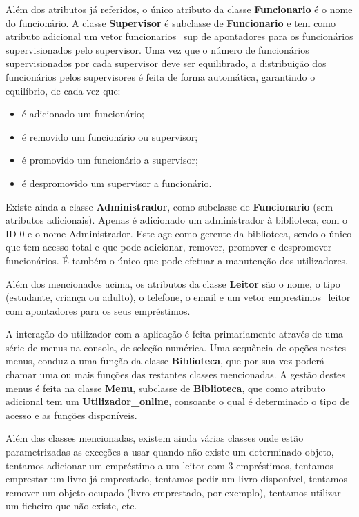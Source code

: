 \documentclass[12pt,a4paper,reqno]{report}
\numberwithin{figure}{section}
\numberwithin{equation}{section}
\begin{document}
Além dos atributos já referidos, o único atributo da classe \textbf{Funcionario} é o \underline{nome} do funcionário. A classe \textbf{Supervisor} é subclasse de \textbf{Funcionario} e tem como atributo adicional um vetor \underline{funcionarios\_sup} de apontadores para os funcionários supervisionados pelo supervisor. Uma vez que o número de funcionários supervisionados por cada supervisor deve ser equilibrado, a distribuição dos funcionários pelos supervisores é feita de forma automática, garantindo o equilíbrio, de cada vez que:
\begin{itemize}
	\item é adicionado um funcionário;
	\item é removido um funcionário ou supervisor;
	\item é promovido um funcionário a supervisor;
	\item é despromovido um supervisor a funcionário.
\end{itemize}

Existe ainda a classe \textbf{Administrador}, como subclasse de \textbf{Funcionario} (sem atributos adicionais). Apenas é adicionado um administrador à biblioteca, com o ID 0 e o nome Administrador. Este age como gerente da biblioteca, sendo o único que tem acesso total e que pode adicionar, remover, promover e despromover funcionários. É também o único que pode efetuar a manutenção dos utilizadores.

Além dos mencionados acima, os atributos da classe \textbf{Leitor} são o \underline{nome}, o \underline{tipo} (estudante, criança ou adulto), o \underline{telefone}, o \underline{email} e um vetor \underline{emprestimos\_leitor} com apontadores para os seus empréstimos.

A interação do utilizador com a aplicação é feita primariamente através de uma série de menus na consola, de seleção numérica. Uma sequência de opções nestes menus, conduz a uma função da classe \textbf{Biblioteca}, que por sua vez poderá chamar uma ou mais funções das restantes classes mencionadas. A gestão destes menus é feita na classe \textbf{Menu}, subclasse de \textbf{Biblioteca}, que como atributo adicional tem um \textbf{Utilizador\_online}, consoante o qual é determinado o tipo de acesso e as funções disponíveis.

Além das classes mencionadas, existem ainda várias classes onde estão parametrizadas as exceções a usar quando não existe um determinado objeto, tentamos adicionar um empréstimo a um leitor com 3 empréstimos, tentamos emprestar um livro já emprestado, tentamos pedir um livro disponível, tentamos remover um objeto ocupado (livro emprestado, por exemplo), tentamos utilizar um ficheiro que não existe, etc.
\end{document}
